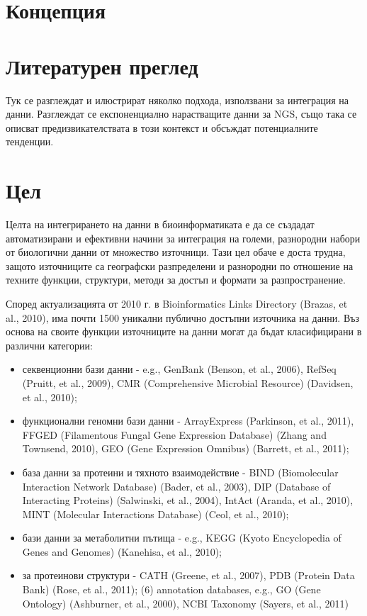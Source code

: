 \documentclass[12pt, a4paper, oneside]{book}
\begin{document}
\chapter*{Концепция}

\chapter*{Литературен преглед}

Тук се разглеждат и илюстрират няколко подхода, използвани за интеграция на данни. Разглеждат се експоненциално нарастващите данни за NGS, също така се описват предизвикателствата в този контекст и обсъждат потенциалните тенденции.\cite{BIOINFORMATICS-TRENDS-AND-METHODOLOGIES}

\chapter*{Цел}

Целта на интегрирането на данни в биоинформатиката е да се създадат автоматизирани и ефективни начини за интеграция на големи, разнородни набори от биологични данни от множество източници. Тази цел обаче е доста трудна, защото източниците са географски разпределени и разнородни по отношение на техните функции, структури, методи за достъп и формати за разпространение.\cite{BIOINFORMATICS-TRENDS-AND-METHODOLOGIES}

Според актуализацията от 2010 г. в Bioinformatics Links Directory (Brazas, et al., 2010), има почти 1500 уникални публично достъпни източника на данни. Въз основа на своите функции източниците на данни могат да бъдат класифицирани в различни категории:

\begin{itemize}
    \item секвенционни бази данни - e.g., GenBank (Benson, et al., 2006), RefSeq (Pruitt, et al., 2009), CMR (Comprehensive Microbial Resource) (Davidsen, et al., 2010);
    \item функционални геномни бази данни - ArrayExpress (Parkinson, et al., 2011), FFGED (Filamentous Fungal Gene Expression Database) (Zhang and Townsend, 2010), GEO (Gene Expression Omnibus) (Barrett, et al., 2011);
    \item база данни за протеини и тяхното взаимодействие - BIND (Biomolecular Interaction Network Database) (Bader, et al., 2003), DIP (Database of Interacting Proteins) (Salwinski, et al., 2004), IntAct (Aranda, et al., 2010), MINT (Molecular Interactions Database) (Ceol, et al., 2010);
    \item бази данни за метаболитни пътища - e.g., KEGG (Kyoto Encyclopedia of Genes and Genomes) (Kanehisa, et al., 2010);
    \item за протеинови структури - CATH (Greene, et al., 2007), PDB (Protein Data Bank) (Rose, et al., 2011); (6) annotation databases, e.g., GO (Gene Ontology) (Ashburner, et al., 2000), NCBI Taxonomy (Sayers, et al., 2011)
\end{itemize}
\end{document}
